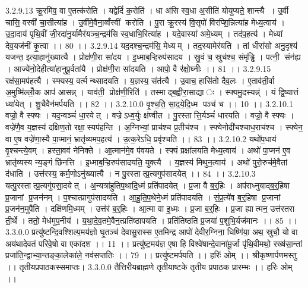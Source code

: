 3.2.9.13
क्रू॒रमि॑व॒ वा ए॒तत्क॑रोति । यद्वेदिं॑ क॒रोति॑ । धा अ॑सि स्व॒धा अ॒सीति॑ योयुप्यते॒ शान्त्यै । उ॒र्वी चासि॒ वस्वी॑ चा॒सीत्या॑ह । उ॒र्वीमे॒वैना॒व्वँस्वीं करोति । पु॒रा क्रू॒रस्य॑ वि॒सृपो॑ विरप्शि॒न्नित्या॑ह मेध्य॒त्वाय॑ । उ॒दा॒दाय॑ पृथि॒वीं जी॒रदा॑नु॒र्यामैर॑यञ्च॒न्द्रम॑सि स्व॒धाभि॒रित्या॑ह । यदे॒वास्या॑ अमे॒ध्यम् । तद॑प॒हत्य॑ । मेध्यां देव॒यज॑नीं कृ॒त्वा ।। 80 ।।
3.2.9.14
यद॒दश्च॒न्द्रम॑सि॒ मेध्यम् । तद॒स्यामेर॑यति । तां धीरा॑सो अनु॒दृश्य॑ यजन्त॒ इत्या॒हानु॑ख्यात्यै । प्रोक्ष॑णी॒रा सा॑दय । इ॒ध्माब॒ऱ्हिरुप॑सादय । स्रु॒वं च॒ स्रुच॑श्च॒ संमृ॑ड्ढि । पत्नी॒॒ संन॑ह्य । आज्ये॑नो॒देहीत्या॑हानुपू॒र्वता॑यै । प्रोक्ष॑णी॒रा सा॑दयति । आपो॒ वै र॑क्षो॒घ्नीः ।। 81 ।।
3.2.9.15
रक्ष॑सा॒मप॑हत्यै । स्फ्यस्य॒ वर्त्मन्थ्सादयति । य॒ज्ञस्य॒ संत॑त्यै । उ॒वाच॒ हासि॑तो दैव॒लः । ए॒ताव॑ती॒र्वा अ॒मुष्मि॑ल्लोँ॒क आप॑ आसन्न् । याव॑ती॒ प्रोक्ष॑णी॒रिति॑ । तस्माद्ब॒ह्वीरा॒साद्याः । स्फ्यमु॒दस्यन्न्॑ । यं द्वि॒ष्यात्तं ध्या॑येत् । शु॒चैवैन॑मर्पयति ।। 82 ।।
3.2.10.0
वृ॒श्च॒ति॒ सा॒द॒ये॒दि॒ध्म पञ्च॑ च ।। 10 ।।
3.2.10.1
वज्रो॒ वै स्फ्यः । यद॒न्वञ्चं॑ धा॒रयेत् । वज्रेऽध्व॒र्युः क्ष॑ण्वीत । पु॒रस्तात्ति॒र्यञ्चं॑ धारयति । वज्रो॒ वै स्फ्यः । वज्रे॑णै॒व य॒ज्ञस्य॑ दक्षिण॒तो रक्षा॒॒स्यप॑हन्ति । अ॒ग्निभ्यां॒ प्राच॑श्च प्र॒तीच॑श्च । स्फ्येनोदी॑चश्चाध॒राच॑श्च । स्फ्येन॒ वा ए॒ष वज्रे॑णा॒स्यै पा॒प्मानं॒ भ्रातृ॑व्यमप॒हत्य॑ । उ॒त्क॒रेऽधि॒ प्रवृ॑श्चति ।। 83 ।।
3.2.10.2
यथो॑प॒धाय॑ वृ॒श्चन्त्ये॒वम् । हस्ता॒वव॑ नेनिक्ते । आ॒त्मान॑मे॒व प॑वयते । स्फ्यं प्रक्षा॑लयति मेध्य॒त्वाय॑ । अथो॑ पा॒प्मन॑ ए॒व भ्रातृ॑व्यस्य न्य॒ङ्गं छि॑नत्ति । इ॒ध्माब॒ऱ्हिरुप॑सादयति॒ युक्त्यै । य॒ज्ञस्य॑ मिथुन॒त्वाय॑ । अथो॑ पुरो॒रुच॑मे॒वैतां द॑धाति । उत्त॑रस्य॒ कर्म॒णोऽनु॑ख्यात्यै । न पु॒रस्तात्प्र॒त्यगुप॑सादयेत् ।। 84 ।।
3.2.10.3
यत्पु॒रस्तात्प्र॒त्यगु॑पसा॒दयेत् । अ॒न्यत्रा॑हुतिप॒थादि॒ध्मं प्रति॑पादयेत् । प्र॒जा वै ब॒र्॒हिः । अप॑राध्नुयाद्ब॒र्॒हिषा प्र॒जानां प्र॒जन॑नम् । प॒श्चात्प्रागुप॑सादयति । आ॒हु॒ति॒प॒थेने॒ध्मं प्रति॑पादयति । सं॒प्र॒त्ये॑व ब॒र्॒हिषा प्र॒जानां प्र॒जन॑न॒मुपै॑ति । दक्षि॑णमि॒ध्मम् । उत्त॑रं ब॒र्॒हिः । आ॒त्मा वा इ॒ध्मः । प्र॒जा ब॒र्॒हिः । प्र॒जा ह्यात्मन॒ उत्त॑रतरा ती॒र्थे । ततो॒ मेध॑मुप॒नीय॑ । य॒था॒दे॒व॒तमे॒वैन॒त्प्रति॑ष्ठापयति । प्रति॑तिष्ठति प्र॒जया॑ प॒शुभि॒र्यज॑मानः ।। 85 ।।
3.3.0.0
प्रत्यु॑ष्टन्दि॒वश्शिल्प॒मय॑ज्ञो घृ॒तञ्च॑ देवासु॒रास्स ए॒तमिन्द्र आपो॑ देवीर॒ग्निना॒ धिष्णि॑या॒ अथ॒ स्रुचौ॒ यो वा अय॑थादेवतं परिवे॒षो वा एका॑दश ।। 11 ।। प्रत्यु॑ष्ट॒मय॑ज्ञ ए॒षा हि विश्वे॑षान्दे॒वाना॑मू॒र्जा पृ॑थि॒वीमथो॒ रख्ष॑सा॒न्तां प्रजा॑ति॒न्द्वाभ्या॒न्तङ्का॒लेका॑ले॒ नव॑सप्ततिः ।। 79 ।। प्रत्यु॑ष्टमर्पयति ।। हरिः॑ ओम् ।। श्रीकृष्णार्पणमस्तु ।। तृतीयप्रपाठकस्समाप्तः।
3.3.0.0
तैत्तिरीयब्राह्मणे तृतीयाष्टके तृतीय प्रपाठक प्रारम्भः ।। हरिः ओम् ।।
